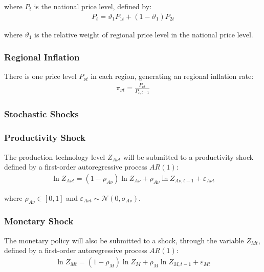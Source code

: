 \documentclass[
thesis.tex
]{subfiles}
\begin{document}
where $P_t$ is the national price level, defined by:
\begin{align}
	P_t = \vartheta_1 P_{1 t} + (1 -\vartheta_1) P_{2 t}
	\label{eq:national-price-level}
\end{align}

where $\vartheta_1$ is the relative weight of regional price level in the national price level.

\subsubsection*{Regional Inflation}

There is one price level $P_{\nu t}$ in each region, generating an regional inflation rate:
\begin{align}
	\pi_{\nu t} = \frac{P_{\nu t}}{P_{\nu, t-1}} \label{eq:regional-inflation}
\end{align}


\subsubsection{Stochastic Shocks}\label{sec:reg-stochastic-shocks}

\subsubsection*{Productivity Shock} \label{sec:reg-productivity-shock}

The production technology level $Z_{A\nu t}$ will be submitted to a productivity shock defined by a first-order autoregressive process $AR(1)$:
\begin{align}
	\ln{Z_{A\nu t}} = (1-\rho_{A\nu})\ln{Z_{A\nu}} + \rho_{A\nu}\ln{Z_{A\nu,t-1}} + \varepsilon_{A\nu t} \label{eq:reg-productivity-shock}
\end{align}

where $\rho_{A\nu} \in [0,1]$ and $\varepsilon_{A\nu t} \sim \mathscr{N}(0,\sigma_{A\nu})$.

\subsubsection*{Monetary Shock} \label{sec:reg-monetary-shock}

The monetary policy will also be submitted to a shock, through the variable $Z_{Mt}$, defined by a first-order autoregressive process $AR(1)$:
\begin{align}
	\ln{Z_{Mt}} = (1-\rho_M)\ln{Z_{M}} + \rho_M\ln{Z_{M,t-1}} + \varepsilon_{Mt} \label{eq:reg-monetary-shock}
\end{align}
\end{document}
